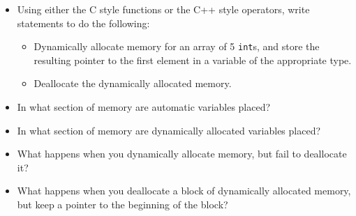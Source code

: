 \begin{itemize}

  \item Using either the C style functions or the C++ style operators, write
    statements to do the following:
    \begin{itemize}
      \item Dynamically allocate memory for an array of 5
        \texttt{int}s, and store the resulting pointer to the first
        element in a variable of the appropriate type.
      \item Deallocate the dynamically allocated memory.
    \end{itemize}
    \vfill

  \item In what section of memory are automatic variables placed?
    \vfill

  \item In what section of memory are dynamically allocated variables placed?
    \vfill

  \item What happens when you dynamically allocate memory, but fail to
    deallocate it?
    \vfill

  \item What happens when you deallocate a block of dynamically allocated
    memory, but keep a pointer to the beginning of the block?
    \vfill

\end{itemize}


